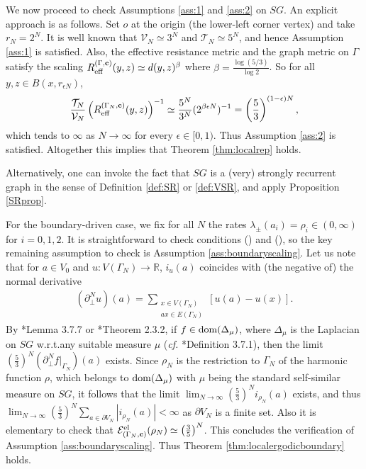 \documentclass[11pt]{amsart}
\theoremstyle{plain}
\theoremstyle{definition}
\theoremstyle{remark}
\begin{document}
We now proceed to check Assumptions \ref{ass:1} and \ref{ass:2} on $SG$. An explicit approach is as follows. Set $o$ at the origin (the lower-left corner vertex) and take $r_N = 2^N$. It is well known that $\mathcal{V}_N \simeq 3^N$ and $\mathcal{T}_N \simeq 5^N$, and hence Assumption \ref{ass:1} is satisfied. Also, the effective resistance metric and the graph metric on $\Gamma$ satisfy the scaling $R_{\rm eff}^{(\Gamma,{\bf c})}(y,z) \simeq d(y,z)^\beta$ where $\beta = \frac{\log(5/3)}{\log 2}$. So for all $y, z\in B(x, r_{\epsilon N})$,
\begin{align}
\frac{\mathcal{T}_N}{\mathcal{V}_N} \left(R_{\rm eff}^{(\Gamma_N,{\bf c})}(y,z)\right)^{-1} \simeq \frac{5^N}{3^N} (2^{\beta \epsilon N})^{-1} = \left(\frac{5}{3}\right)^{(1-\epsilon)N},
\end{align}
which tends to $\infty$ as $N\to\infty$ for every $\epsilon\in [0,1)$. Thus Assumption \ref{ass:2} is satisfied. Altogether this implies that Theorem \ref{thm:localrep} holds.

Alternatively, one can invoke the fact that $SG$ is a (very) strongly recurrent graph in the sense of Definition \ref{def:SR} or \ref{def:VSR}, and apply Proposition \ref{SRprop}.

For the boundary-driven case, we fix for all $N$ the rates $\lambda_\pm(a_i) = \rho_i \in (0,\infty)$ for $i=0,1,2$. It is straightforward to check conditions () and (), so the key remaining assumption to check is Assumption \ref{ass:boundaryscaling}. Let us note that for $a\in V_0$ and $u: V(\Gamma_N)\to\mathbb{R}$, $i_u(a)$ coincides with (the negative of) the normal derivative
\begin{align}
(\partial_\perp^N u)(a) = \sum_{\substack{x\in V(\Gamma_N) \\ ax\in E(\Gamma_N)}} [u(a)-u(x)]. 
\end{align}
By \cite{Kigami}*{Lemma 3.7.7} or \cite{StrichartzBook}*{Theorem 2.3.2}, if $f \in {\rm dom}(\Delta_\mu)$, where $\Delta_\mu$ is the Laplacian on $SG$ w.r.t.\@ any suitable measure $\mu$ (\emph{cf.\@} \cite{Kigami}*{Definition 3.7.1}), then the limit $(\frac{5}{3})^N (\partial^N_\perp f|_{\Gamma_N})(a)$ exists. Since $\rho_N$ is the restriction to $\Gamma_N$ of the harmonic function $\rho$, which belongs to ${\rm dom}(\Delta_\mu)$ with $\mu$ being the standard self-similar measure on $SG$, it follows that the limit $\lim_{N\to\infty} (\frac{5}{3})^N i_{\rho_N}(a)$ exists, and thus $\lim_{N\to\infty} (\frac{5}{3})^N \sum_{a \in \partial V_N} |i_{\rho_N}(a)| <\infty$ as $\partial V_N$ is a finite set. Also it is elementary to check that $\mathcal{E}^{\rm el}_{(\Gamma_N,{\bf c})}(\rho_N) \simeq \left(\frac{3}{5}\right)^N$. This concludes the verification of Assumption \ref{ass:boundaryscaling}. Thus Theorem \ref{thm:localergodicboundary} holds.
\end{document}

